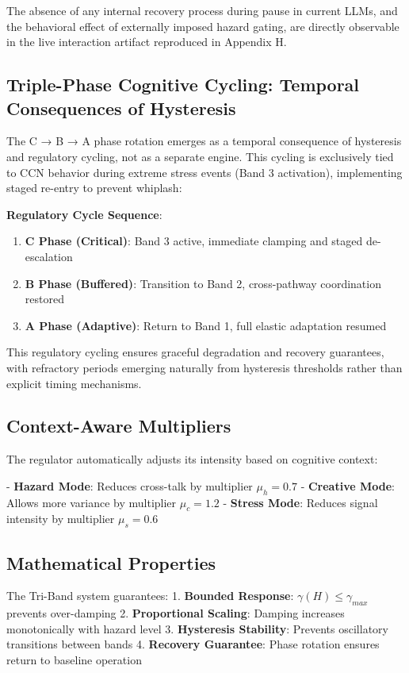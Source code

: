 \documentclass[12pt,a4paper]{report}
\begin{document}
The absence of any internal recovery process during pause in current LLMs, and the behavioral effect of externally imposed hazard gating, are directly observable in the live interaction artifact reproduced in Appendix H.

\subsection{Triple-Phase Cognitive Cycling: Temporal Consequences of Hysteresis}

The C → B → A phase rotation emerges as a temporal consequence of hysteresis and regulatory cycling, not as a separate engine. This cycling is exclusively tied to CCN behavior during extreme stress events (Band 3 activation), implementing staged re-entry to prevent whiplash:

\textbf{Regulatory Cycle Sequence}:
\begin{enumerate}
\item \textbf{C Phase (Critical)}: Band 3 active, immediate clamping and staged de-escalation
\item \textbf{B Phase (Buffered)}: Transition to Band 2, cross-pathway coordination restored  
\item  \textbf{A Phase (Adaptive)}: Return to Band 1, full elastic adaptation resumed
\end{enumerate}


This regulatory cycling ensures graceful degradation and recovery guarantees, with refractory periods emerging naturally from hysteresis thresholds rather than explicit timing mechanisms.

\subsection{Context-Aware Multipliers}

The regulator automatically adjusts its intensity based on cognitive context:

- \textbf{Hazard Mode}: Reduces cross-talk by multiplier $\mu_h = 0.7$
- \textbf{Creative Mode}: Allows more variance by multiplier $\mu_c = 1.2$
- \textbf{Stress Mode}: Reduces signal intensity by multiplier $\mu_s = 0.6$

\subsection{Mathematical Properties}

The Tri-Band system guarantees:
1. \textbf{Bounded Response}: $\gamma(H) \leq \gamma_{max}$ prevents over-damping
2. \textbf{Proportional Scaling}: Damping increases monotonically with hazard level
3. \textbf{Hysteresis Stability}: Prevents oscillatory transitions between bands
4. \textbf{Recovery Guarantee}: Phase rotation ensures return to baseline operation
\end{document}
